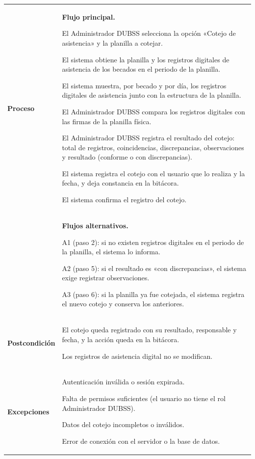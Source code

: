 \begin{longtable}{>{\raggedright\arraybackslash}p{2.9cm} >{\raggedright\arraybackslash}p{12.6cm}}
\midrule
\textbf{Proceso} & \textbf{Flujo principal.}
\begin{cupasos}
    \item El Administrador DUBSS selecciona la opción «Cotejo de asistencia» y la planilla a cotejar.
    \item El sistema obtiene la planilla y los registros digitales de asistencia de los becados en el periodo de la planilla.
    \item El sistema muestra, por becado y por día, los registros digitales de asistencia junto con la estructura de la planilla.
    \item El Administrador DUBSS compara los registros digitales con las firmas de la planilla física.
    \item El Administrador DUBSS registra el resultado del cotejo: total de registros, coincidencias, discrepancias, observaciones y resultado (conforme o con discrepancias).
    \item El sistema registra el cotejo con el usuario que lo realiza y la fecha, y deja constancia en la bitácora.
    \item El sistema confirma el registro del cotejo.
\end{cupasos} \\
 & \textbf{Flujos alternativos.}
\begin{cuvin}
    \item A1 (paso 2): si no existen registros digitales en el periodo de la planilla, el sistema lo informa.
    \item A2 (paso 5): si el resultado es «con discrepancias», el sistema exige registrar observaciones.
    \item A3 (paso 6): si la planilla ya fue cotejada, el sistema registra el nuevo cotejo y conserva los anteriores.
\end{cuvin} \\
\midrule
\textbf{Postcondición} & \vspace{-\baselineskip}\begin{cuvin}
    \item El cotejo queda registrado con su resultado, responsable y fecha, y la acción queda en la bitácora.
    \item Los registros de asistencia digital no se modifican.
\end{cuvin} \\
\midrule
\textbf{Excepciones} & \vspace{-\baselineskip}\begin{cuvin}
    \item Autenticación inválida o sesión expirada.
    \item Falta de permisos suficientes (el usuario no tiene el rol Administrador DUBSS).
    \item Datos del cotejo incompletos o inválidos.
    \item Error de conexión con el servidor o la base de datos.
\end{cuvin} \\
\end{longtable}
\endgroup
\addtocounter{table}{-1}

